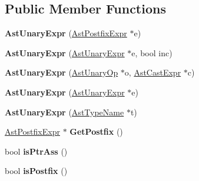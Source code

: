 \subsection*{Public Member Functions}
\begin{DoxyCompactItemize}
\item 
\hypertarget{classAstUnaryExpr_a7afc6e7c4cf309676aa701656c70453a}{{\bfseries Ast\-Unary\-Expr} (\hyperlink{classAstPostfixExpr}{Ast\-Postfix\-Expr} $\ast$e)}\label{classAstUnaryExpr_a7afc6e7c4cf309676aa701656c70453a}

\item 
\hypertarget{classAstUnaryExpr_a82859566c71d787e29263ff3ba013261}{{\bfseries Ast\-Unary\-Expr} (\hyperlink{classAstUnaryExpr}{Ast\-Unary\-Expr} $\ast$e, bool inc)}\label{classAstUnaryExpr_a82859566c71d787e29263ff3ba013261}

\item 
\hypertarget{classAstUnaryExpr_ad71de2cd2c65b31e5f5f5fde4e75fc14}{{\bfseries Ast\-Unary\-Expr} (\hyperlink{classAstUnaryOp}{Ast\-Unary\-Op} $\ast$o, \hyperlink{classAstCastExpr}{Ast\-Cast\-Expr} $\ast$c)}\label{classAstUnaryExpr_ad71de2cd2c65b31e5f5f5fde4e75fc14}

\item 
\hypertarget{classAstUnaryExpr_a22b7c004d42c54c96b40de10cc90a07e}{{\bfseries Ast\-Unary\-Expr} (\hyperlink{classAstUnaryExpr}{Ast\-Unary\-Expr} $\ast$e)}\label{classAstUnaryExpr_a22b7c004d42c54c96b40de10cc90a07e}

\item 
\hypertarget{classAstUnaryExpr_a305b745cf1449c3d3dc4e74dcd768ef1}{{\bfseries Ast\-Unary\-Expr} (\hyperlink{classAstTypeName}{Ast\-Type\-Name} $\ast$t)}\label{classAstUnaryExpr_a305b745cf1449c3d3dc4e74dcd768ef1}

\item 
\hypertarget{classAstUnaryExpr_a0892bfd110770a877a6c654875beae05}{\hyperlink{classAstPostfixExpr}{Ast\-Postfix\-Expr} $\ast$ {\bfseries Get\-Postfix} ()}\label{classAstUnaryExpr_a0892bfd110770a877a6c654875beae05}

\item 
\hypertarget{classAstUnaryExpr_a0f960c91e1328b3ca78cf0bd98790900}{bool {\bfseries is\-Ptr\-Ass} ()}\label{classAstUnaryExpr_a0f960c91e1328b3ca78cf0bd98790900}

\item 
\hypertarget{classAstUnaryExpr_a8adfdc9b288dcb86e7ed6854601eef28}{bool {\bfseries is\-Postfix} ()}\label{classAstUnaryExpr_a8adfdc9b288dcb86e7ed6854601eef28}


\end{DoxyCompactItemize}
